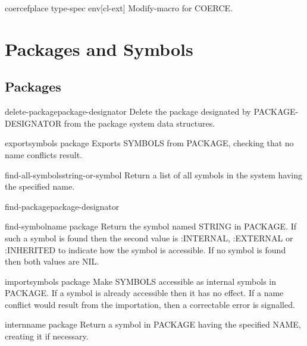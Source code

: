 \documentclass[10pt,english]{book}
\begin{document}
\begin{macro}{coercef}{place type-spec \env env}[cl-ext]
  Modify-macro for COERCE.
\end{macro}



\chapter{Packages and Symbols}

\section{Packages}

\begin{function}{delete-package}{package-designator}
  Delete the package designated by PACKAGE-DESIGNATOR from the package
  system data structures.
\end{function}

\begin{function}{export}{symbols \op package}
  Exports SYMBOLS from PACKAGE, checking that no name conflicts result.
\end{function}

\begin{function}{find-all-symbols}{string-or-symbol}
  Return a list of all symbols in the system having the specified name.
\end{function}

\begin{function}{find-package}{package-designator}
  
\end{function}

\begin{function}{find-symbol}{name \op package}
  Return the symbol named STRING in PACKAGE. If such a symbol is found
  then the second value is :INTERNAL, :EXTERNAL or :INHERITED to indicate
  how the symbol is accessible. If no symbol is found then both values
  are NIL.
\end{function}

\begin{function}{import}{symbols \op package}
  Make SYMBOLS accessible as internal symbols in PACKAGE. If a symbol is
already accessible then it has no effect. If a name conflict would result from
the importation, then a correctable error is signalled.
\end{function}

\begin{function}{intern}{name \op package}
  Return a symbol in PACKAGE having the specified NAME, creating it
  if necessary.
\end{function}
\end{document}
